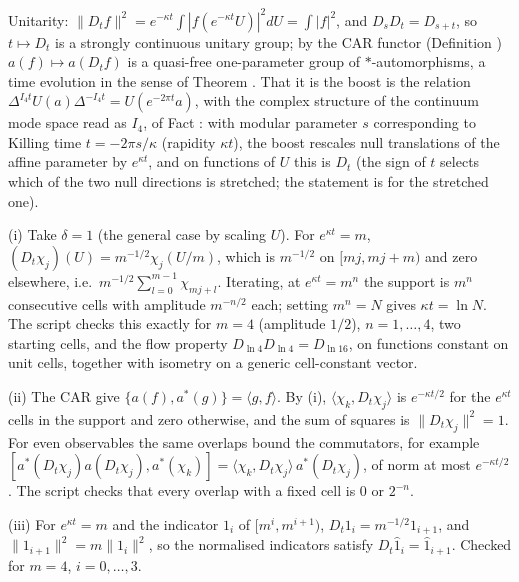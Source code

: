 Unitarity: $\|D_{t}f\|^{2} = e^{-\kappa t}\int|f(e^{-\kappa t}U)|^{2}dU = \int|f|^{2}$, and $D_{s}D_{t} = D_{s+t}$, so $t \mapsto D_{t}$ is a strongly continuous unitary group; by the CAR functor (Definition ) $a(f) \mapsto a(D_{t}f)$ is a quasi-free one-parameter group of $*$-automorphisms, a time evolution in the sense of Theorem . That it is the boost is the relation $\Delta^{I_{4}t}U(a)\Delta^{-I_{4}t} = U(e^{-2\pi t}a)$, with the complex structure of the continuum mode space read as $I_{4}$, of Fact : with modular parameter $s$ corresponding to Killing time $t = -2\pi s/\kappa$ (rapidity $\kappa t$), the boost rescales null translations of the affine parameter by $e^{\kappa t}$, and on functions of $U$ this is $D_{t}$ (the sign of $t$ selects which of the two null directions is stretched; the statement is for the stretched one).

(i) Take $\delta = 1$ (the general case by scaling $U$). For $e^{\kappa t} = m$, $(D_{t}\chi_{j})(U) = m^{-1/2}\chi_{j}(U/m)$, which is $m^{-1/2}$ on $[mj, mj + m)$ and zero elsewhere, i.e.\ $m^{-1/2}\sum_{l=0}^{m-1}\chi_{mj+l}$. Iterating, at $e^{\kappa t} = m^{n}$ the support is $m^{n}$ consecutive cells with amplitude $m^{-n/2}$ each; setting $m^{n} = N$ gives $\kappa t = \ln N$. The script checks this exactly for $m = 4$ (amplitude $1/2$), $n = 1, \dots, 4$, two starting cells, and the flow property $D_{\ln 4}D_{\ln 4} = D_{\ln 16}$, on functions constant on unit cells, together with isometry on a generic cell-constant vector.

(ii) The CAR give $\{a(f), a^{*}(g)\} = \langle g, f\rangle$. By (i), $\langle\chi_{k}, D_{t}\chi_{j}\rangle$ is $e^{-\kappa t/2}$ for the $e^{\kappa t}$ cells in the support and zero otherwise, and the sum of squares is $\|D_{t}\chi_{j}\|^{2} = 1$. For even observables the same overlaps bound the commutators, for example $[a^{*}(D_{t}\chi_{j})a(D_{t}\chi_{j}), a^{*}(\chi_{k})] = \langle\chi_{k}, D_{t}\chi_{j}\rangle\,a^{*}(D_{t}\chi_{j})$, of norm at most $e^{-\kappa t/2}$. The script checks that every overlap with a fixed cell is $0$ or $2^{-n}$.

(iii) For $e^{\kappa t} = m$ and the indicator $1_{i}$ of $[m^{i}, m^{i+1})$, $D_{t}1_{i} = m^{-1/2}1_{i+1}$, and $\|1_{i+1}\|^{2} = m\|1_{i}\|^{2}$, so the normalised indicators satisfy $D_{t}\hat{1}_{i} = \hat{1}_{i+1}$. Checked for $m = 4$, $i = 0, \dots, 3$.

